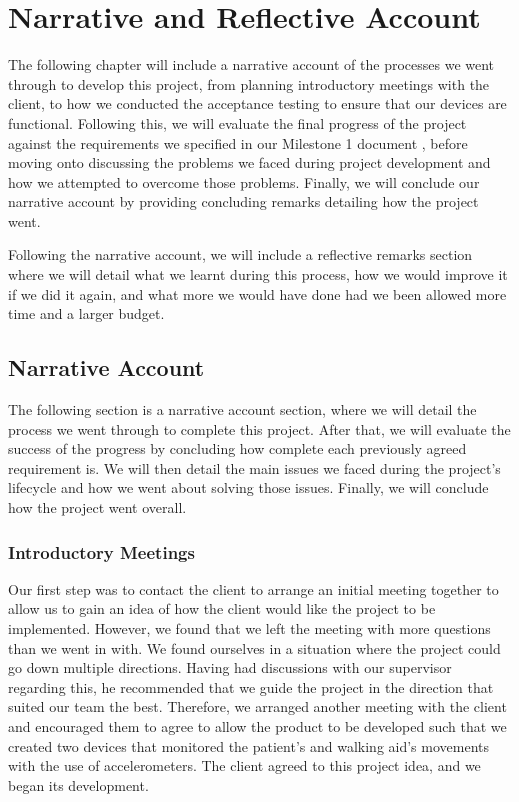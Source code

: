\chapter{Narrative and Reflective Account}
\label{ch:narrative}

    The following chapter will include a narrative account of the processes we went through to develop this project, from planning introductory meetings with the client, to how we conducted the acceptance testing to ensure that our devices are functional. Following this, we will evaluate the final progress of the project against the requirements we specified in our Milestone 1 document \cite{coaker}, before moving onto discussing the problems we faced during project development and how we attempted to overcome those problems. Finally, we will conclude our narrative account by providing concluding remarks detailing how the project went.

    Following the narrative account, we will include a reflective remarks section where we will detail what we learnt during this process, how we would improve it if we did it again, and what more we would have done had we been allowed more time and a larger budget.

    \section{Narrative Account}
    \label{sec:narrative_account}

        The following section is a narrative account section, where we will detail the process we went through to complete this project. After that, we will evaluate the success of the progress by concluding how complete each previously agreed requirement is. We will then detail the main issues we faced during the project's lifecycle and how we went about solving those issues. Finally, we will conclude how the project went overall.

        \subsection{Introductory Meetings}

            Our first step was to contact the client to arrange an initial meeting together to allow us to gain an idea of how the client would like the project to be implemented. However, we found that we left the meeting with more questions than we went in with. We found ourselves in a situation where the project could go down multiple directions. Having had discussions with our supervisor regarding this, he recommended that we guide the project in the direction that suited our team the best. Therefore, we arranged another meeting with the client and encouraged them to agree to allow the product to be developed such that we created two devices that monitored the patient's and walking aid's movements with the use of accelerometers. The client agreed to this project idea, and we began its development.

